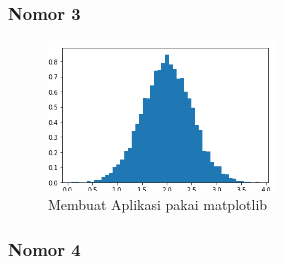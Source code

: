 \subsubsection{Nomor 3}
\hfill\break

\begin{figure}[H]
\centerline{\includegraphics[width=6cm]{figures/1174079/3/praktek2.PNG}}
\caption{Membuat Aplikasi pakai matplotlib}
\label{labelgambar}
\end{figure}

\subsubsection{Nomor 4}
\hfill\break

